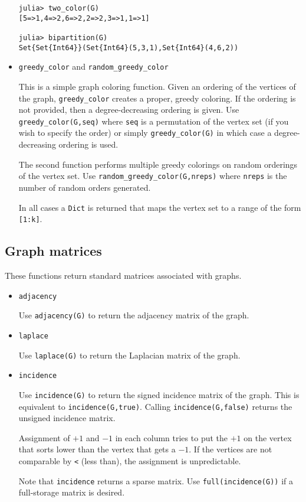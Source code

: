 \documentclass[oneside]{amsart}
\begin{document}
\begin{itemize}
{\begin{verbatim}
julia> two_color(G)
[5=>1,4=>2,6=>2,2=>2,3=>1,1=>1]

julia> bipartition(G)
Set{Set{Int64}}(Set{Int64}(5,3,1),Set{Int64}(4,6,2))
\end{verbatim}
  }


\item \verb|greedy_color| and \verb|random_greedy_color|

  This is a simple graph coloring function. Given an ordering of the
  vertices of the graph, \verb|greedy_color| creates a proper, greedy
  coloring. If the ordering is not provided, then a degree-decreasing
  ordering is given. Use \verb|greedy_color(G,seq)| where \verb|seq|
  is a permutation of the vertex set (if you wish to specify the
  order) or simply \verb|greedy_color(G)| in which case a
  degree-decreasing ordering is used.

  The second function performs multiple greedy colorings on random
  orderings of the vertex set. Use \verb|random_greedy_color(G,nreps)|
  where \verb|nreps| is the number of random orders generated.

  In all cases a \verb|Dict| is returned that maps the vertex set to a
  range of the form \verb|[1:k]|.



\end{itemize}

\subsection*{Graph matrices}

These functions return standard matrices associated with graphs.

\begin{itemize}
\item \verb|adjacency|

  Use \verb|adjacency(G)| to return the adjacency matrix of the graph.

\item \verb|laplace|

  Use \verb|laplace(G)| to return the Laplacian matrix of the graph.

\item \verb|incidence|

  Use \verb|incidence(G)| to return the signed incidence matrix of the
  graph. This is equivalent to \verb|incidence(G,true)|. Calling
  \verb|incidence(G,false)| returns the unsigned incidence matrix.

  Assignment of $+1$ and $-1$ in each column tries to put the $+1$ on
  the vertex that sorts lower than the vertex that gets a $-1$. If the
  vertices are not comparable by \verb|<| (less than), the assignment
  is unpredictable.

  Note that \verb|incidence| returns a sparse matrix. Use
  \verb|full(incidence(G))| if a full-storage matrix is desired.
\end{itemize}
\end{document}
